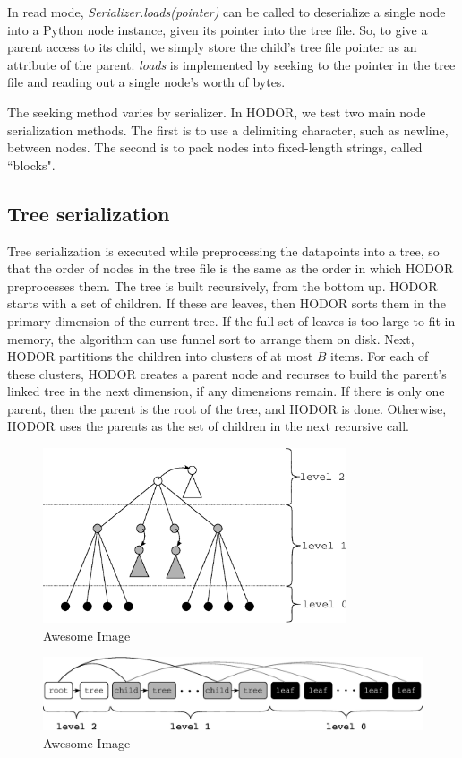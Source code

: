 \documentclass[11pt, oneside]{article}
\newcommand{\ms}{\textit}
\begin{document}
In read mode, \ms{Serializer.loads(pointer)} can be called to deserialize a
single node into a Python node instance, given its pointer into the tree file.
So, to give a parent access to its child, we simply store the child's tree file
pointer as an attribute of the parent. \ms{loads} is implemented by seeking to
the pointer in the tree file and reading out a single node's worth of bytes.

The seeking method varies by serializer. In HODOR, we test two main node
serialization methods. The first is to use a delimiting character, such as
newline, between nodes. The second is to pack nodes into fixed-length strings,
called ``blocks". 

\subsection{Tree serialization}

Tree serialization is executed while preprocessing the datapoints into a tree,
so that the order of nodes in the tree file is the same as the order in which
HODOR preprocesses them. The tree is built recursively, from the bottom up.
HODOR starts with a set of children. If these are leaves, then HODOR sorts them
in the primary dimension of the current tree. If the full set of leaves is too
large to fit in memory, the algorithm can use funnel sort to arrange them on
disk. Next, HODOR partitions the children into clusters of at most $B$ items.
For each of these clusters, HODOR creates a parent node and recurses to build
the parent's linked tree in the next dimension, if any dimensions remain. If
there is only one parent, then the parent is the root of the tree, and HODOR is
done.  Otherwise, HODOR uses the parents as the set of children in the next
recursive call. 

\begin{figure}[p]
    \centering
    \includegraphics[width=0.8\textwidth]{fig1.eps}
    \caption{Awesome Image}
\end{figure}
\begin{figure}[p]
    \centering
    \includegraphics[width=1\textwidth]{fig2.eps}
    \caption{Awesome Image}
\end{figure}
\end{document}
